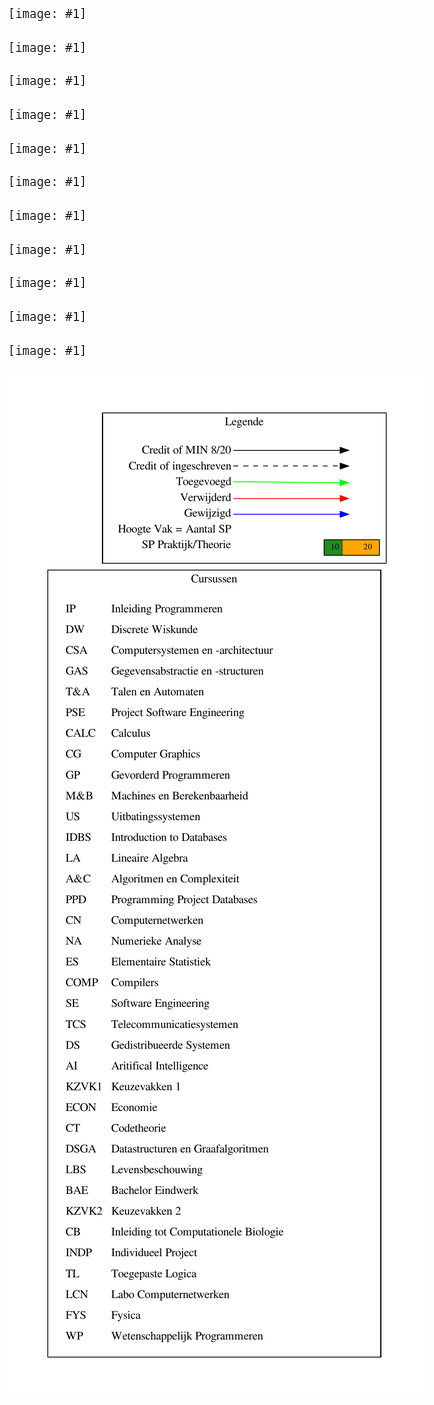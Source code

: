 \documentclass[a4paper]{article}
\newcommand*{\includeFullPage}[1]{ %
    \newpage%
    \vspace*{-2.5cm}%
    \hspace*{-0.16\textwidth}%
    \texttt{[image: \#1]}%
}
\begin{document}
        \includeFullPage{Overview/LBS_solution_rel.pdf}

        \includeFullPage{Overview/BAE_solution_rel.pdf}

        \includeFullPage{Overview/WP_solution_rel.pdf}

        \includeFullPage{Overview/ECON_solution_rel.pdf}

        \includeFullPage{Overview/CT_solution_rel.pdf}

        \includeFullPage{Overview/CB_solution_rel.pdf}

        \includeFullPage{Overview/INDP_solution_rel.pdf}

        \includeFullPage{Overview/TL_solution_rel.pdf}

        \includeFullPage{Overview/LCN_solution_rel.pdf}

        \includeFullPage{Overview/FYS_solution_rel.pdf}


    \includeFullPage{solution_abs.pdf}

    \newpage
    \recalctypearea

    \newpage
    \vspace*{-3.5cm}
    \includegraphics[height=1.5\textheight]{legend.pdf}
\end{document}
